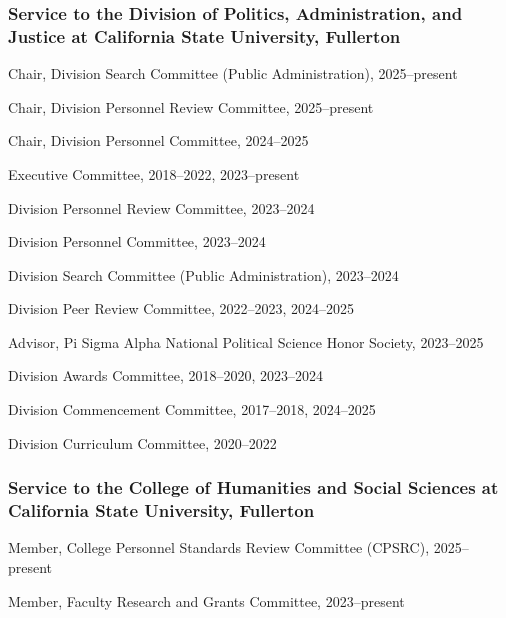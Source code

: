 \documentclass[11pt,letterpaper]{article}
\renewenvironment{itemize}{
  \begin{list}{}{
    \setlength{\leftmargin}{1.5em}
    \setlength{\itemsep}{0.25em}
    \setlength{\parskip}{0pt}
    \setlength{\parsep}{0.25em}
  }
}{
  \end{list}
}
\begin{document}
\subsubsection*{Service to the Division of Politics, Administration, and Justice at California State University, Fullerton}
\begin{itemize}\leftmargin=2pt\itemindent=-15pt
    \item Chair, Division Search Committee (Public Administration), 2025--present
    \item Chair, Division Personnel Review Committee, 2025--present
    \item Chair, Division Personnel Committee, 2024--2025
    \item Executive Committee, 2018--2022, 2023--present
    \item Division Personnel Review Committee, 2023--2024
    \item Division Personnel Committee, 2023--2024
    \item Division Search Committee (Public Administration), 2023--2024
    \item Division Peer Review Committee, 2022--2023, 2024--2025
    \item Advisor, Pi Sigma Alpha National Political Science Honor Society, 2023--2025
    \item Division Awards Committee, 2018--2020, 2023--2024
    \item Division Commencement Committee, 2017--2018, 2024--2025
    \item Division Curriculum Committee, 2020--2022
\end{itemize}

\subsubsection*{Service to the College of Humanities and Social Sciences at California State University, Fullerton}
\begin{itemize}\leftmargin=2pt\itemindent=-15pt
    \item Member, College Personnel Standards Review Committee (CPSRC), 2025--present
    \item Member, Faculty Research and Grants Committee, 2023--present
\end{itemize}
\end{document}
